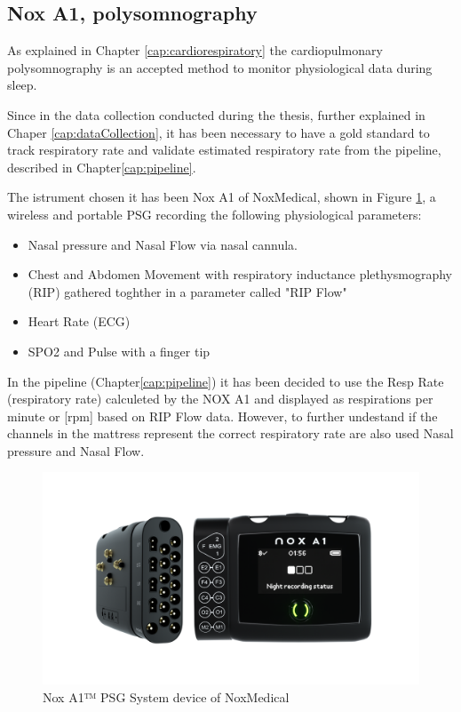 \subsection{Nox A1, polysomnography} \label{cap:NOXA1}
As explained in Chapter \ref{cap:cardiorespiratory} the cardiopulmonary polysomnography is an accepted method to monitor physiological data during sleep.

Since in the data collection conducted during the thesis, further explained in Chaper \ref{cap:dataCollection}, it has been necessary to have a gold standard to track respiratory rate and validate estimated respiratory rate from the pipeline, described in Chapter\ref*{cap:pipeline}.

The istrument chosen it has been Nox A1 of NoxMedical, shown in Figure \ref{fig:NOXA1}, a wireless and portable PSG recording the following physiological parameters: 

\begin{itemize}
    \item Nasal pressure and Nasal Flow via nasal cannula.
    \item Chest and Abdomen Movement with respiratory inductance plethysmography (RIP) gathered toghther in a parameter called "RIP Flow"
    \item Heart Rate (ECG)
    \item SPO2 and Pulse with a finger tip
\end{itemize}

In the pipeline (Chapter\ref*{cap:pipeline}) it has been decided to use the Resp Rate (respiratory rate) calculeted by the NOX A1 and displayed as respirations per minute or [rpm] based on RIP Flow data.
However, to further undestand if the channels in the mattress represent the correct respiratory rate are also used Nasal pressure and Nasal Flow.

\begin{figure}[H]
    \centering
    \includegraphics[width=\textwidth]{img/1.png}
    \caption{Nox A1™ PSG System device of NoxMedical}
    \label{fig:NOXA1}
\end{figure}

